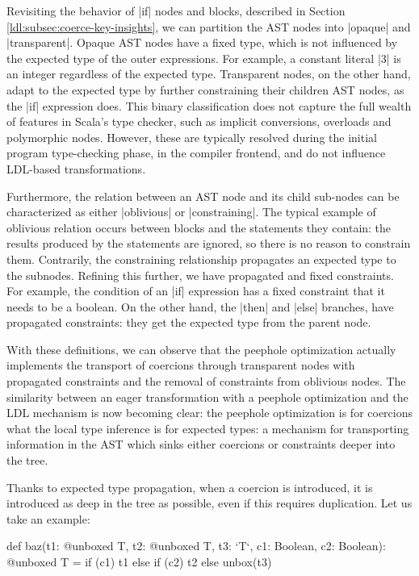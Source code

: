 Revisiting the behavior of |if| nodes and blocks, described in Section \ref{ldl:subsec:coerce-key-insights}, we can partition the AST nodes into |opaque| and |transparent|. Opaque AST nodes have a fixed type, which is not influenced by the expected type of the outer expressions. For example, a constant literal |3| is an integer regardless of the expected type. Transparent nodes, on the other hand, adapt to the expected type by further constraining their children AST nodes, as the |if| expression does. This binary classification does not capture the full wealth of features in Scala's type checker, such as implicit conversions, overloads and polymorphic nodes. However, these are typically resolved during the initial program type-checking phase, in the compiler frontend, and do not influence LDL-based transformations.

Furthermore, the relation between an AST node and its child sub-nodes can be characterized as either |oblivious| or |constraining|. The typical example of oblivious relation occurs between blocks and the statements they contain: the results produced by the statements are ignored, so there is no reason to constrain them. Contrarily, the constraining relationship propagates an expected type to the subnodes. Refining this further, we have propagated and fixed constraints. For example, the condition of an |if| expression has a fixed constraint that it needs to be a boolean. On the other hand, the |then| and |else| branches, have propagated constraints: they get the expected type from the parent node.

With these definitions, we can observe that the peephole optimization actually implements the transport of coercions through transparent nodes with propagated constraints and the removal of constraints from oblivious nodes. The similarity between an eager transformation with a peephole optimization and the LDL mechanism is now becoming clear: the peephole optimization is for coercions what the local type inference is for expected types: a mechanism for transporting information in the AST which sinks either coercions or constraints deeper into the tree.

Thanks to expected type propagation, when a coercion is introduced, it is introduced as deep in the tree as possible, even if this requires duplication. Let us take an example:

\begin{lstlisting-nobreak}
 def baz(t1: @unboxed T, t2: @unboxed T, t3: `T`, c1: Boolean, c2: Boolean): @unboxed T =
   if (c1)
     t1
   else
     if (c2)
       t2
     else
       unbox(t3)
\end{lstlisting-nobreak}

